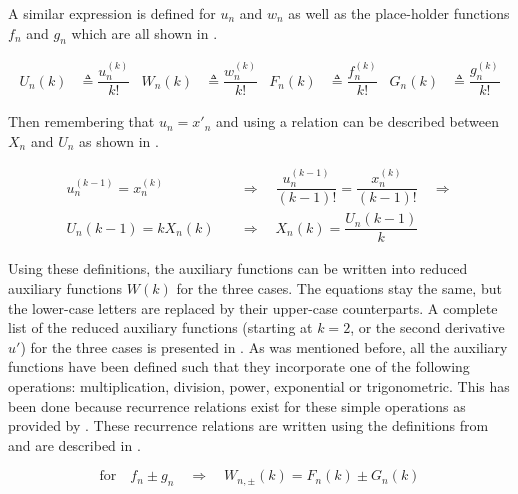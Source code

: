 \noindent
A similar expression is defined for $u_{n}$ and $w_{n}$ as well as the place-holder functions $f_{n}$ and $g_{n}$ which are all shown in .

\begin{align} \label{eq:redDer}
U_{n}\left(k\right)& \triangleq \dfrac{u_{n}^{\left(k\right)}}{k!}
&
W_{n}\left(k\right)& \triangleq \dfrac{w_{n}^{\left(k\right)}}{k!}
&
F_{n}\left(k\right)& \triangleq \dfrac{f_{n}^{\left(k\right)}}{k!}
&
G_{n}\left(k\right)& \triangleq \dfrac{g_{n}^{\left(k\right)}}{k!}
\end{align}


\noindent
Then remembering that $u_{n}=x'_{n}$ and using  a relation can be described between $X_{n}$ and $U_{n}$ as shown in  \citep{scott2008high}. 

\begin{equation} \label{eq:UnXn}
\begin{split}
u_{n}^{\left( k-1\right)}=x_{n}^{\left( k\right)} \quad &\Rightarrow \quad \dfrac{u_{n}^{\left( k-1\right)}}{\left(k-1\right)!} = \dfrac{x_{n}^{\left( k\right)}}{\left(k-1\right)!} \quad \Rightarrow\\
U_{n}\left(k-1\right)=kX_{n}\left(k\right) \quad &\Rightarrow \quad X_{n}\left(k\right)=\dfrac{U_{n}\left(k-1\right)}{k}
\end{split}
\end{equation}

\noindent
Using these definitions, the auxiliary functions can be written into reduced auxiliary functions $W\left(k\right)$ for the three cases. The equations stay the same, but the lower-case letters are replaced by their upper-case counterparts. A complete list of the reduced auxiliary functions (starting at $k=2$, or the second derivative $u'$) for the three cases is presented in .
As was mentioned before, all the auxiliary functions have been defined such that they incorporate one of the following operations: multiplication, division, power, exponential or trigonometric. This has been done because recurrence relations exist for these simple operations as provided by \cite{jorba2005software}. These recurrence relations are written using the definitions from  and are described in .

\begin{equation} \label{eq:recRel1}
\text{for} \quad f_{n} \pm g_{n} \quad \Rightarrow \quad W_{n,\pm}\left(k\right)= F_{n}\left(k\right) \pm G_{n}\left(k\right)
\end{equation}

